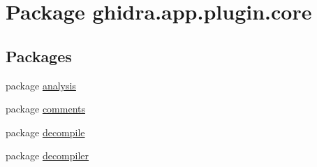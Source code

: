 \hypertarget{namespaceghidra_1_1app_1_1plugin_1_1core}{}\section{Package ghidra.\+app.\+plugin.\+core}
\label{namespaceghidra_1_1app_1_1plugin_1_1core}
\subsection*{Packages}
\begin{DoxyCompactItemize}
\item 
package \mbox{\hyperlink{namespaceghidra_1_1app_1_1plugin_1_1core_1_1analysis}{analysis}}
\item 
package \mbox{\hyperlink{namespaceghidra_1_1app_1_1plugin_1_1core_1_1comments}{comments}}
\item 
package \mbox{\hyperlink{namespaceghidra_1_1app_1_1plugin_1_1core_1_1decompile}{decompile}}
\item 
package \mbox{\hyperlink{namespaceghidra_1_1app_1_1plugin_1_1core_1_1decompiler}{decompiler}}
\end{DoxyCompactItemize}
